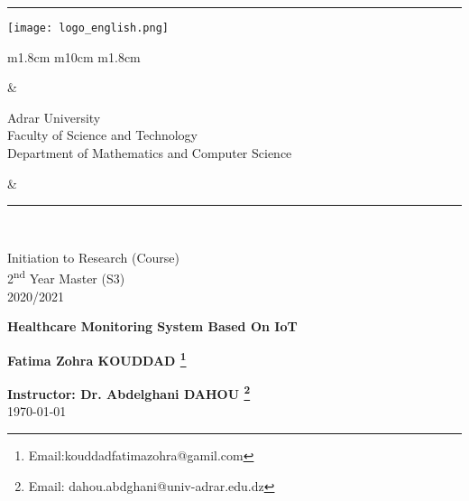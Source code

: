 \documentclass[paper=a4, fontsize=11pt]{scrartcl}
\numberwithin{equation}{section}		%
\numberwithin{figure}{section}			%
\numberwithin{table}{section}				%
\newcommand{\horrule}[1]{\rule{\linewidth}{#1}} 	%
\begin{document}
		
{\flushleft\horrule{2pt}
\begin{center}
{\texttt{[image: logo\_english.png]}} 
\begin{tabular}{ m{1.8cm} m{10cm} m{1.8cm}}
\begin{center}
\end{center}
&
\begin{center} 
{\small
{Adrar University} \\
{Faculty of Science and Technology} \\
{Department of Mathematics and Computer Science}} \\

\end{center}
&

\begin{center}
\end{center}
\end{tabular}
\end{center}
\flushleft \horrule{2pt}\\[1cm]
}


\begin{center}

{
\huge  
Initiation to Research (Course) \\
\vspace{0.2cm}
2\textsuperscript{nd} Year Master (S3) \\
\vspace{0.2cm}
2020/2021}\\

\vspace{1cm}

{
\Huge   
\textbf{Healthcare Monitoring System Based On IoT }}\\
\vspace{1cm}

{
\Large
\textbf{Fatima Zohra KOUDDAD \footnote{Email:kouddadfatimazohra@gamil.com} }}\\
\vspace{3cm}

{
\large
\textbf{Instructor: Dr. Abdelghani DAHOU \footnote{Email: dahou.abdghani@univ-adrar.edu.dz}}}\\
\today
\end{center}
\pagebreak
\tableofcontents
\pagebreak
\listoffigures
\pagebreak
\listoftables
\pagebreak
\end{document}
